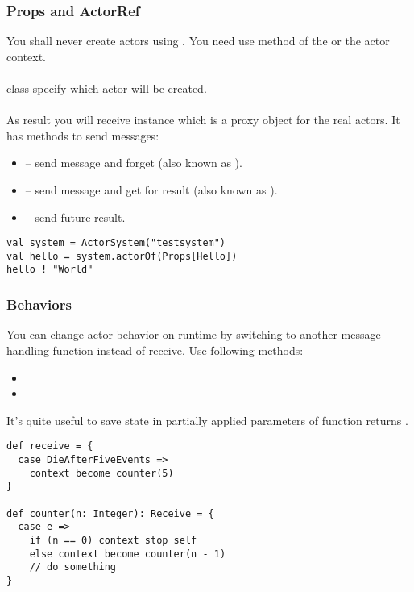 \documentclass{beamer}
\begin{document}
\begin{frame}[fragile]
\frametitle{Props and ActorRef}
You shall never create actors using . You need use  method of the
 or the actor context.\\~\\

 class specify which actor will be created.\\~\\

As result you will receive  instance which is a proxy object for the real actors.
It has methods to send messages:
\begin{itemize}
\item \linline{!} -- send message and forget (also known as ).
\item {} -- send message and get  for result (also known as ).
\item {} -- send future result.
\end{itemize}
\begin{example}
\begin{lstlisting}
val system = ActorSystem("testsystem")
val hello = system.actorOf(Props[Hello])
hello ! "World"
\end{lstlisting}
\end{example}
\end{frame}

\begin{frame}[fragile]
\frametitle{Behaviors}
You can change actor behavior on runtime by switching to another message handling function instead
of receive. Use following  methods:
\begin{itemize}
\item {}
\item {}
\end{itemize}

It's quite useful to save state in partially applied parameters of function returns .
\begin{example}
\begin{lstlisting}
def receive = {
  case DieAfterFiveEvents =>
    context become counter(5)
}

def counter(n: Integer): Receive = {
  case e =>
    if (n == 0) context stop self
    else context become counter(n - 1)
    // do something
}
\end{lstlisting}
\end{example}
\end{frame}
\end{document}
